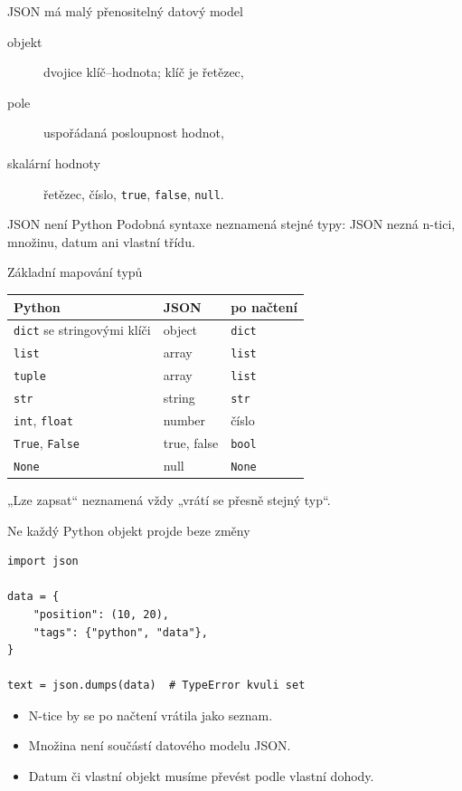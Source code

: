 \documentclass[aspectratio=169]{beamer}
\begin{document}
\begin{frame}{JSON má malý přenositelný datový model}
  \begin{description}
    \item[objekt] dvojice klíč--hodnota; klíč je řetězec,
    \item[pole] uspořádaná posloupnost hodnot,
    \item[skalární hodnoty] řetězec, číslo, \texttt{true}, \texttt{false}, \texttt{null}.
  \end{description}
  \begin{block}{JSON není Python}
    Podobná syntaxe neznamená stejné typy: JSON nezná n-tici, množinu, datum ani vlastní třídu.
  \end{block}
\end{frame}

\begin{frame}{Základní mapování typů}
  \centering
  \begin{tabular}{lll}
    \textbf{Python} & \textbf{JSON} & \textbf{po načtení} \\
    \hline
    \texttt{dict} se stringovými klíči & object & \texttt{dict} \\
    \texttt{list} & array & \texttt{list} \\
    \texttt{tuple} & array & \texttt{list} \\
    \texttt{str} & string & \texttt{str} \\
    \texttt{int}, \texttt{float} & number & číslo \\
    \texttt{True}, \texttt{False} & true, false & \texttt{bool} \\
    \texttt{None} & null & \texttt{None} \\
  \end{tabular}
  \vspace{5mm}

  „Lze zapsat“ neznamená vždy „vrátí se přesně stejný typ“.
\end{frame}

\begin{frame}[fragile]{Ne každý Python objekt projde beze změny}
\begin{lstlisting}[style=pythonSmall]
import json

data = {
    "position": (10, 20),
    "tags": {"python", "data"},
}

text = json.dumps(data)  # TypeError kvuli set
\end{lstlisting}
  \begin{itemize}
    \item N-tice by se po načtení vrátila jako seznam.
    \item Množina není součástí datového modelu JSON.
    \item Datum či vlastní objekt musíme převést podle vlastní dohody.
  \end{itemize}
\end{frame}
\end{document}
